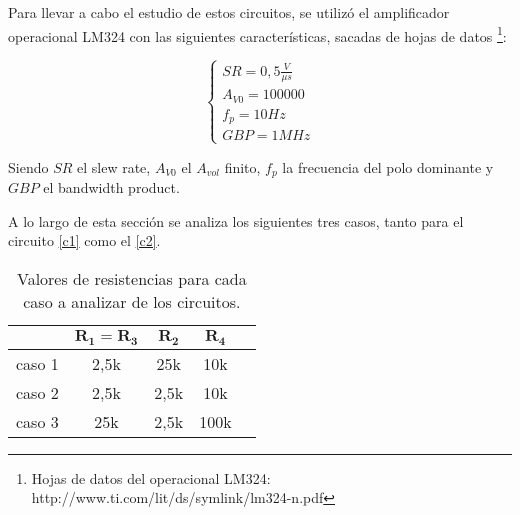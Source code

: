 Para llevar a cabo el estudio
 de estos circuitos, se utilizó el amplificador operacional LM324 con las 
 siguientes características, sacadas de hojas de datos
 \footnote{Hojas de datos del operacional LM324: http://www.ti.com/lit/ds/symlink/lm324-n.pdf}:

 \begin{equation}
	\begin{cases}
		SR = 0,5\frac{V}{\mu s}\\
		A_{V0} = 100000\\
		f_p = 10Hz\\
		GBP = 1MHz
	\end{cases}
	\label{lm324}
\end{equation}

Siendo $SR$ el slew rate, $A_{V0}$ el $A_{vol}$ finito, $f_p$ la frecuencia del polo dominante y $GBP$ el bandwidth product.

A lo largo de esta sección se analiza los siguientes tres casos, tanto para
el circuito \ref{c1} como el \ref{c2}.

\begin{table}[h!]
	\centering
	\begin{tabular}{c c c c c}%
		\bfseries  & $\bm{R_1 = R_3}$ & $\bm{R_2}$ & $\bm{R_4}$  \\ \hline
		caso 1 & 2,5k & 25k & 10k \\
		caso 2 & 2,5k & 2,5k & 10k \\
		caso 3 & 25k & 2,5k & 100k \\
		\hline
	\end{tabular}
	\caption{Valores de resistencias para cada caso a analizar de los circuitos.}
	\label{casos}
\end{table}



























